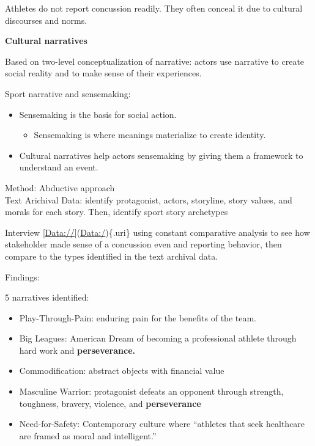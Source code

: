 \documentclass[
]{book}
\providecommand{\tightlist}{%
  \setlength{\itemsep}{0pt}\setlength{\parskip}{0pt}}
\begin{document}
\citep{Zanin_2019}

Athletes do not report concussion readily.
They often conceal it due to cultural discourses and norms.

\textbf{Cultural narratives}

Based on \citep{Polkinghorne_1995} two-level conceptualization of narrative: actors use narrative to create social reality and to make sense of their experiences.

Sport narrative and sensemaking:

\begin{itemize}
\item
  Sensemaking is the basis for social action.

  \begin{itemize}
  \tightlist
  \item
    Sensemaking is where meanings materialize to create identity.
  \end{itemize}
\item
  Cultural narratives help actors sensemaking by giving them a framework to understand an event.
\end{itemize}

Method: Abductive approach\\
Text Arichival Data: identify protagonist, actors, storyline, story values, and morals for each story.
Then, identify sport story archetypes

Interview {[}\url{Data://}{]}(\url{Data:/})\{.uri\} using constant comparative analysis to see how stakeholder made sense of a concussion even and reporting behavior, then compare to the types identified in the text archival data.

Findings:

5 narratives identified:

\begin{itemize}
\tightlist
\item
  Play-Through-Pain: enduring pain for the benefits of the team.
\item
  Big Leagues: American Dream of becoming a professional athlete through hard work and \textbf{perseverance.}
\item
  Commodification: abstract objects with financial value
\item
  Masculine Warrior: protagonist defeats an opponent through strength, toughness, bravery, violence, and \textbf{perseverance}
\item
  Need-for-Safety: Contemporary culture where ``athletes that seek healthcare are framed as moral and intelligent.''
\end{itemize}
\end{document}
